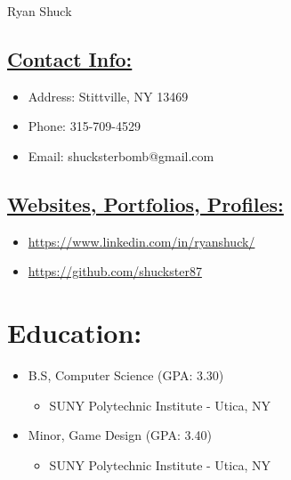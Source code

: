 \documentclass[12pt, oneside, a4paper]{article}
\begin{document}
\begin{flushleft}
    \Huge\color{blue} Ryan Shuck
\end{flushleft}

\begin{paracol}{2}
    \begin{leftcolumn}
        \begin{flushleft}
            \section*{\underline{Contact Info:}}
            \footnotesize
            \begin{itemize}
                \item Address: Stittville, NY 13469
                \item Phone: 315-709-4529
                \item Email: shucksterbomb@gmail.com
            \end{itemize}
        \end{flushleft}
    \end{leftcolumn}

    \begin{rightcolumn}
        \section*{\underline{Websites, Portfolios, Profiles:}}
        \begin{itemize}
            \footnotesize
            \item \url{https://www.linkedin.com/in/ryanshuck/}
            \item \url{https://github.com/shuckster87}
        \end{itemize}
    \end{rightcolumn}
\end{paracol}

\noindent{\color{blue} \rule{\linewidth}{1mm}}

\section*{Education:}
\begin{itemize}
    \scriptsize
    \item B.S, Computer Science (GPA: 3.30)
          \begin{itemize}
              \item SUNY Polytechnic Institute - Utica, NY
          \end{itemize}
    \item Minor, Game Design (GPA: 3.40)
          \begin{itemize}
              \item SUNY Polytechnic Institute - Utica, NY
          \end{itemize}
\end{itemize}
\end{document}
